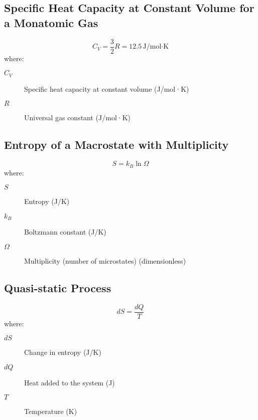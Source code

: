 \documentclass{article}
\begin{document}
\subsection*{Specific Heat Capacity at Constant Volume for a Monatomic Gas}
\begin{equation}
C_V = \frac{3}{2}R = 12.5 \, \text{J/mol·K}
\end{equation}
where:
\begin{description}
    \item[$C_V$] Specific heat capacity at constant volume (J/mol·K)
    \item[$R$] Universal gas constant (J/mol·K)
\end{description}

\subsection*{Entropy of a Macrostate with Multiplicity}
\begin{equation}
S = k_B \ln \Omega
\end{equation}
where:
\begin{description}
    \item[$S$] Entropy (J/K)
    \item[$k_B$] Boltzmann constant (J/K)
    \item[$\Omega$] Multiplicity (number of microstates) (dimensionless)
\end{description}

\subsection*{Quasi-static Process}
\begin{equation}
dS = \frac{dQ}{T}
\end{equation}
where:
\begin{description}
    \item[$dS$] Change in entropy (J/K)
    \item[$dQ$] Heat added to the system (J)
    \item[$T$] Temperature (K)
\end{description}
\end{document}
